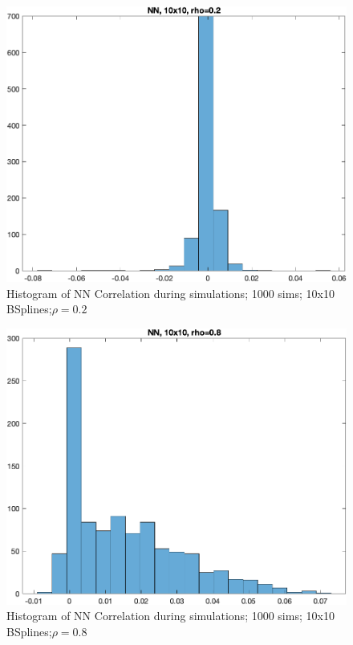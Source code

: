 \documentclass[
]{article}
\begin{document}
\begin{figure}[H]

{\centering \includegraphics{../figures/hist_nn_rho-0.2_Opt_PC_NN_0_10x10.png}

}

\caption{Histogram of NN Correlation during simulations; 1000 sims;
10x10 BSplines;\(\rho=0.2\)}

\end{figure}%
\begin{figure}[H]

{\centering \includegraphics{../figures/hist_nn_rho-0.8_Opt_PC_NN_0_10x10.png}

}

\caption{Histogram of NN Correlation during simulations; 1000 sims;
10x10 BSplines;\(\rho=0.8\)}

\end{figure}%
\end{document}
